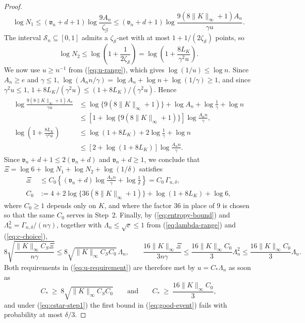 \documentclass{article} %
\begin{document}
\begin{proof}
\[
  \log N_1
  \le(\mathfrak{v}_n+d+1)\log\frac{9A_n}{\zeta_{\mathcal{G}}}
  \le(\mathfrak{v}_n+d+1)\log\frac{9(8\lVert K\rVert_\infty+1)A_n}{\gamma u} .
\]
The interval $\mathcal{S}_n\subseteq[0,1]$ admits a $\zeta_{\mathcal{S}}$-net with at most $1+1/(2\zeta_{\mathcal{S}})$ points, so
\[
  \log N_2\le\log\left(1+\frac{1}{2\zeta_{\mathcal{S}}}\right)
  =\log\left(1+\frac{8L_K}{\gamma^2u}\right).
\]
We now use $u\ge n^{-1}$ from (\ref{eq:u-range}), which gives $\log(1/u)\le\log n$.  Since $A_n\ge e$ and $\gamma\le1$, $\log(A_nn/\gamma)=\log A_n+\log n+\log(1/\gamma)\ge1$, and since $\gamma^2u\le1$, $1+8L_K/(\gamma^2u)\le(1+8L_K)/(\gamma^2u)$.  Hence
\[
\begin{aligned}
  \log\frac{9(8\lVert K\rVert_\infty+1)A_n}{\gamma u}
  &\le\log\{9(8\lVert K\rVert_\infty+1)\}+\log A_n+\log\frac{1}{\gamma}+\log n
  \\
  &\le\left[1+\log\{9(8\lVert K\rVert_\infty+1)\}\right]\log\frac{A_nn}{\gamma},
  \\
  \log\left(1+\frac{8L_K}{\gamma^2u}\right)
  &\le\log\left(1+8L_K\right)+2\log\frac{1}{\gamma}+\log n
  \\
  &\le\left[2+\log\left(1+8L_K\right)\right]\log\frac{A_nn}{\gamma} .
\end{aligned}
\]
Since $\mathfrak{v}_n+d+1\le2(\mathfrak{v}_n+d)$ and $\mathfrak{v}_n+d\ge1$, we conclude that $\Xi=\log6+\log N_1+\log N_2+\log(1/\delta)$ satisfies
\begin{equation}
\begin{aligned}
  \Xi
  &\le C_0\left\{(\mathfrak{v}_n+d)\log\frac{A_nn}{\gamma}+\log\frac{1}{\delta}\right\}
  =C_0\,\Gamma_{n,\delta},
  \\
  C_0&:=4+2\log\{36(8\lVert K\rVert_\infty+1)\}+\log\left(1+8L_K\right)+\log6 ,
\end{aligned}
  \label{eq:entropy-bound}
\end{equation}
where $C_0\ge1$ depends only on $K$, and where the factor $36$ in place of $9$ is chosen so that the same $C_0$ serves in Step~2.  Finally, by (\ref{eq:entropy-bound}) and $\Lambda_n^2=\Gamma_{n,\delta}/(n\gamma)$, together with $\Lambda_n\le\sqrt{c}\le1$ from (\ref{eq:lambda-range}) and (\ref{eq:c-choice}),
\[
  8\sqrt{\frac{\lVert K\rVert_\infty C_S\Xi}{n\gamma}}
  \le8\sqrt{\lVert K\rVert_\infty C_SC_0}\,\Lambda_n ,
  \qquad
  \frac{16\lVert K\rVert_\infty\Xi}{3n\gamma}
  \le\frac{16\lVert K\rVert_\infty C_0}{3}\Lambda_n^2
  \le\frac{16\lVert K\rVert_\infty C_0}{3}\Lambda_n .
\]
Both requirements in (\ref{eq:u-requirement}) are therefore met by $u=C_\ast\Lambda_n$ as soon as
\begin{equation}
  C_\ast\ \ge\ 8\sqrt{\lVert K\rVert_\infty C_SC_0}
  \qquad\text{and}\qquad
  C_\ast\ \ge\ \frac{16\lVert K\rVert_\infty C_0}{3} ,
  \label{eq:cstar-step1}
\end{equation}
and under (\ref{eq:cstar-step1}) the first bound in (\ref{eq:good-event}) fails with probability at most $\delta/3$.


\end{proof}
\end{document}
